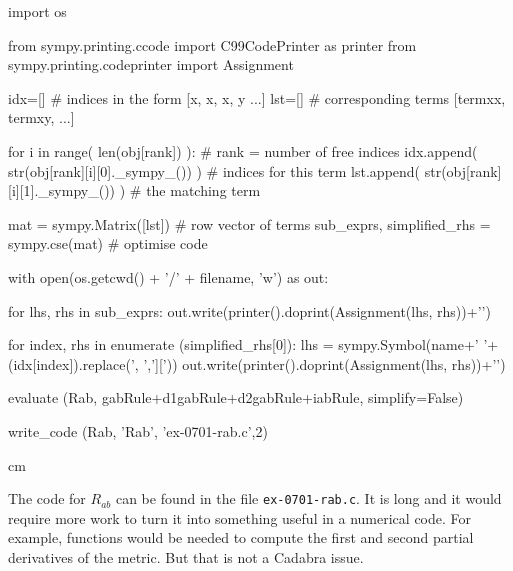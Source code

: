 \documentclass[12pt]{cdblatex}
\begin{document}
\begin{cadabra}
      import os

      from sympy.printing.ccode import C99CodePrinter as printer
      from sympy.printing.codeprinter import Assignment

      idx=[]  # indices in the form [{x, x}, {x, y} ...]
      lst=[]  # corresponding terms [termxx, termxy, ...]

      for i in range( len(obj[rank]) ):                 # rank = number of free indices
          idx.append( str(obj[rank][i][0]._sympy_()) )  # indices for this term
          lst.append( str(obj[rank][i][1]._sympy_()) )  # the matching term

      mat = sympy.Matrix([lst])                         # row vector of terms
      sub_exprs, simplified_rhs = sympy.cse(mat)        # optimise code

      with open(os.getcwd() + '/' + filename, 'w') as out:

         for lhs, rhs in sub_exprs:
            out.write(printer().doprint(Assignment(lhs, rhs))+'\n')

         for index, rhs in enumerate (simplified_rhs[0]):
            lhs = sympy.Symbol(name+' '+(idx[index]).replace(', ',']['))
            out.write(printer().doprint(Assignment(lhs, rhs))+'\n')

   evaluate   (Rab,  gabRule+d1gabRule+d2gabRule+iabRule, simplify=False)

   write_code (Rab, 'Rab', 'ex-0701-rab.c',2)

\end{cadabra}

 cm

The code for $R_{ab}$ can be found in the file {\tt ex-0701-rab.c}. It is long and it would require more
work to turn it into something useful in a numerical code. For example, functions would be needed to
compute the first and second partial derivatives of the metric. But that is not a Cadabra issue.
\end{document}
